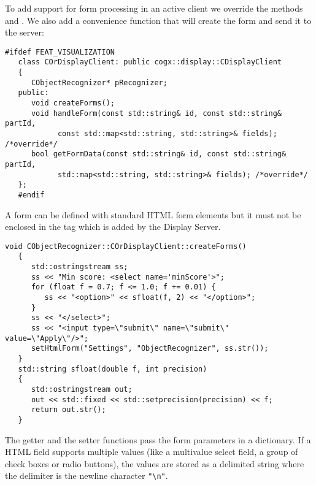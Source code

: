 To add support for form processing in an active client we override the methods
 and . We also add a convenience
function that will create the form and send it to the server:

\begin{Verbatim}[fontsize=\scriptsize,gobble=3]
   #ifdef FEAT_VISUALIZATION
   class COrDisplayClient: public cogx::display::CDisplayClient
   {
      CObjectRecognizer* pRecognizer;
   public:
      void createForms();
      void handleForm(const std::string& id, const std::string& partId,
            const std::map<std::string, std::string>& fields); /*override*/
      bool getFormData(const std::string& id, const std::string& partId,
            std::map<std::string, std::string>& fields); /*override*/
   };
   #endif
\end{Verbatim}

A form can be defined with standard HTML form elements but it must not be
enclosed in the  tag which is added by the Display Server.

\begin{Verbatim}[fontsize=\scriptsize,gobble=3]
   void CObjectRecognizer::COrDisplayClient::createForms()
   {
      std::ostringstream ss;
      ss << "Min score: <select name='minScore'>";
      for (float f = 0.7; f <= 1.0; f += 0.01) {
         ss << "<option>" << sfloat(f, 2) << "</option>";
      }
      ss << "</select>";
      ss << "<input type=\"submit\" name=\"submit\" value=\"Apply\"/>";
      setHtmlForm("Settings", "ObjectRecognizer", ss.str());
   }
   std::string sfloat(double f, int precision)
   {
      std::ostringstream out;
      out << std::fixed << std::setprecision(precision) << f;
      return out.str();
   }
\end{Verbatim}

The getter and the setter functions pass the form parameters in a dictionary.
If a HTML field supports multiple values (like a multivalue select field, a
group of check boxes or radio buttons), the values are stored as a delimited
string where the delimiter is the newline character \Verb|"\n"|.

